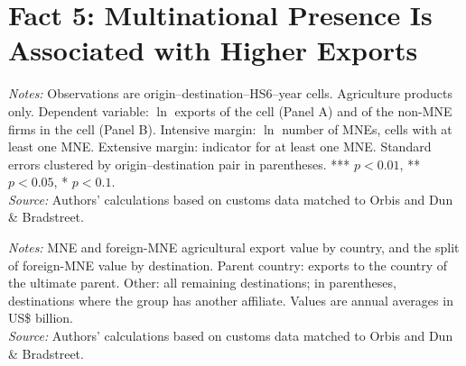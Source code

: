 \documentclass[11pt,a4paper]{article}
\begin{document}
\section{Fact 5: Multinational Presence Is Associated with Higher Exports}\label{sec:f5_agro}
\begin{table}[H]\centering\small%
  \caption{Agriculture: Multinational Presence and Exports}%
  \label{tab:t1_agro}%
  \par\vspace{3pt}%
  \begin{minipage}{0.95\textwidth}\footnotesize %
  \textit{Notes:} Observations are origin--destination--HS6--year cells. Agriculture products only. Dependent variable: $\ln$ exports of the cell (Panel A) and of the non-MNE firms in the cell (Panel B). Intensive margin: $\ln$ number of MNEs, cells with at least one MNE. Extensive margin: indicator for at least one MNE. Standard errors clustered by origin--destination pair in parentheses. *** $p<0.01$, ** $p<0.05$, * $p<0.1$.\\[3pt]%
  \textit{Source:} Authors' calculations based on customs data matched to Orbis and Dun \& Bradstreet.%
  \end{minipage}%
  \end{table}
\begin{table}[H]\centering\small%
  \caption{Agriculture: Multinational Exports by Exporting Country and Destination Type}%
  \label{tab:pres_agro}%
  \par\vspace{3pt}%
  \begin{minipage}{0.95\textwidth}\footnotesize %
  \textit{Notes:} MNE and foreign-MNE agricultural export value by country, and the split of foreign-MNE value by destination. Parent country: exports to the country of the ultimate parent. Other: all remaining destinations; in parentheses, destinations where the group has another affiliate. Values are annual averages in US\$ billion.\\[3pt]%
  \textit{Source:} Authors' calculations based on customs data matched to Orbis and Dun \& Bradstreet.%
  \end{minipage}%
  \end{table}
\end{document}
